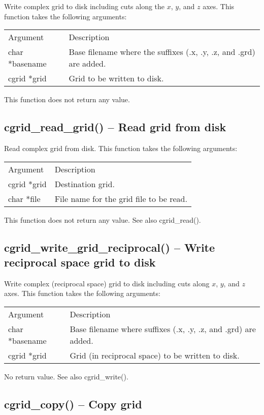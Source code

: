 \documentclass[12pt,letterpaper]{report}
\begin{document}
Write complex grid to disk including cuts along the $x$, $y$, and $z$ axes. This function takes the following arguments:
\begin{longtable}{p{} p{}}
Argument & Description\\
\cline{1-2}
char *basename & Base filename where the suffixes (.x, .y, .z, and .grd) are added.\\
cgrid *grid & Grid to be written to disk.\\
\end{longtable}
\noindent
This function does not return any value.

\subsection{cgrid\_read\_grid() -- Read grid from disk}

Read complex grid from disk. This function takes the following arguments:
\begin{longtable}{p{} p{}}
Argument & Description\\
\cline{1-2}
cgrid *grid & Destination grid.\\
char *file & File name for the grid file to be read.\\
\end{longtable}
\noindent
This function does not return any value. See also cgrid\_read().

\subsection{cgrid\_write\_grid\_reciprocal() -- Write reciprocal space grid to disk}

Write complex (reciprocal space) grid to disk including cuts along $x$, $y$, and $z$ axes. This function takes the following arguments:
\begin{longtable}{p{} p{}}
Argument & Description\\
\cline{1-2}
char *basename & Base filename where suffixes (.x, .y, .z, and .grd) are added.\\
cgrid *grid & Grid (in reciprocal space) to be written to disk.\\
\end{longtable}
\noindent
No return value. See also cgrid\_write().

\subsection{cgrid\_copy() -- Copy grid}
\end{document}
